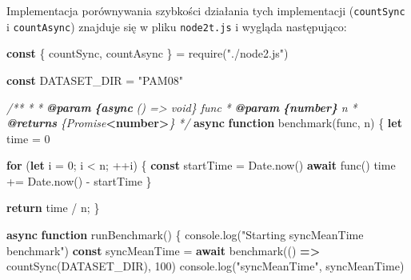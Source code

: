 \documentclass[11pt]{article}
\newenvironment{Shaded}{}{}
\newcommand{\KeywordTok}[1]{\textcolor[rgb]{0.00,0.44,0.13}{\textbf{{#1}}}}
\newcommand{\DecValTok}[1]{\textcolor[rgb]{0.25,0.63,0.44}{{#1}}}
\newcommand{\StringTok}[1]{\textcolor[rgb]{0.25,0.44,0.63}{{#1}}}
\newcommand{\CommentTok}[1]{\textcolor[rgb]{0.38,0.63,0.69}{\textit{{#1}}}}
\newcommand{\FunctionTok}[1]{\textcolor[rgb]{0.02,0.16,0.49}{{#1}}}
\newcommand{\NormalTok}[1]{{#1}}
\newcommand{\AnnotationTok}[1]{\textcolor[rgb]{0.38,0.63,0.69}{\textbf{\textit{{#1}}}}}
\newcommand{\CommentVarTok}[1]{\textcolor[rgb]{0.38,0.63,0.69}{\textbf{\textit{{#1}}}}}
\newcommand{\ControlFlowTok}[1]{\textcolor[rgb]{0.00,0.44,0.13}{\textbf{{#1}}}}
\newcommand{\OperatorTok}[1]{\textcolor[rgb]{0.40,0.40,0.40}{{#1}}}
\newcommand{\BuiltInTok}[1]{{#1}}
\newcommand{\PreprocessorTok}[1]{\textcolor[rgb]{0.74,0.48,0.00}{{#1}}}
\begin{document}
    Implementacja porównywania szybkości działania tych implementacji
(\texttt{countSync} i \texttt{countAsync}) znajduje się w pliku
\texttt{node2t.js} i wygląda następująco:

\begin{Shaded}
\begin{Highlighting}[]
\KeywordTok{const}\NormalTok{ \{ countSync}\OperatorTok{,}\NormalTok{ countAsync \} }\OperatorTok{=} \PreprocessorTok{require}\NormalTok{(}\StringTok{"./node2.js"}\NormalTok{)}

\KeywordTok{const}\NormalTok{ DATASET\_DIR }\OperatorTok{=} \StringTok{"PAM08"}

\CommentTok{/**}
\CommentTok{ * }
\CommentTok{ * }\AnnotationTok{@param}\CommentTok{ }\CommentVarTok{\{async}\CommentTok{ () =\textgreater{} void\} func }
\CommentTok{ * }\AnnotationTok{@param}\CommentTok{ }\CommentVarTok{\{number\}}\CommentTok{ n }
\CommentTok{ * }\AnnotationTok{@returns}\CommentTok{ \{Promise}\KeywordTok{\textless{}number\textgreater{}}\CommentTok{\}}
\CommentTok{ */}
\KeywordTok{async} \KeywordTok{function} \FunctionTok{benchmark}\NormalTok{(func}\OperatorTok{,}\NormalTok{ n) \{}
    \KeywordTok{let}\NormalTok{ time }\OperatorTok{=} \DecValTok{0}

    \ControlFlowTok{for}\NormalTok{ (}\KeywordTok{let}\NormalTok{ i }\OperatorTok{=} \DecValTok{0}\OperatorTok{;}\NormalTok{ i }\OperatorTok{\textless{}}\NormalTok{ n}\OperatorTok{;} \OperatorTok{++}\NormalTok{i) \{}
        \KeywordTok{const}\NormalTok{ startTime }\OperatorTok{=} \BuiltInTok{Date}\OperatorTok{.}\FunctionTok{now}\NormalTok{()}
        \ControlFlowTok{await} \FunctionTok{func}\NormalTok{()}
\NormalTok{        time }\OperatorTok{+=} \BuiltInTok{Date}\OperatorTok{.}\FunctionTok{now}\NormalTok{() }\OperatorTok{{-}}\NormalTok{ startTime}
\NormalTok{    \}}

    \ControlFlowTok{return}\NormalTok{ time }\OperatorTok{/}\NormalTok{ n}\OperatorTok{;}
\NormalTok{\}}

\KeywordTok{async} \KeywordTok{function} \FunctionTok{runBenchmark}\NormalTok{() \{}
    \BuiltInTok{console}\OperatorTok{.}\FunctionTok{log}\NormalTok{(}\StringTok{"Starting syncMeanTime benchmark"}\NormalTok{)}
    \KeywordTok{const}\NormalTok{ syncMeanTime }\OperatorTok{=} \ControlFlowTok{await} \FunctionTok{benchmark}\NormalTok{(() }\KeywordTok{=\textgreater{}} \FunctionTok{countSync}\NormalTok{(DATASET\_DIR)}\OperatorTok{,} \DecValTok{100}\NormalTok{)}
    \BuiltInTok{console}\OperatorTok{.}\FunctionTok{log}\NormalTok{(}\StringTok{"syncMeanTime"}\OperatorTok{,}\NormalTok{ syncMeanTime)}


\end{Highlighting}
\end{Shaded}
\end{document}
